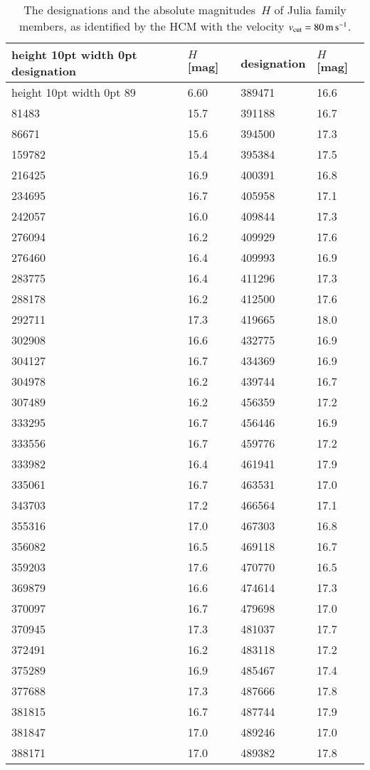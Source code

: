 
\begin{table}
\caption{The designations and the absolute magnitudes~$H$ of Julia family members,
as identified by the HCM with the velocity $v_{\rm cut} = 80\,{\rm m}\,{\rm s}^{-1}$.}
\centering
\begin{tabular}{ll|ll}
\hline
\vrule height 10pt width 0pt
designation & $H$ [mag] & designation & $H$ [mag]\\
\hline
\vrule height 10pt width 0pt
    89 & 6.60 & 389471 & 16.6\\
 81483 & 15.7 & 391188 & 16.7\\
 86671 & 15.6 & 394500 & 17.3\\
159782 & 15.4 & 395384 & 17.5\\
216425 & 16.9 & 400391 & 16.8\\
234695 & 16.7 & 405958 & 17.1\\
242057 & 16.0 & 409844 & 17.3\\
276094 & 16.2 & 409929 & 17.6\\
276460 & 16.4 & 409993 & 16.9\\
283775 & 16.4 & 411296 & 17.3\\
288178 & 16.2 & 412500 & 17.6\\
292711 & 17.3 & 419665 & 18.0\\
302908 & 16.6 & 432775 & 16.9\\
304127 & 16.7 & 434369 & 16.9\\
304978 & 16.2 & 439744 & 16.7\\
307489 & 16.2 & 456359 & 17.2\\
333295 & 16.7 & 456446 & 16.9\\
333556 & 16.7 & 459776 & 17.2\\
333982 & 16.4 & 461941 & 17.9\\
335061 & 16.7 & 463531 & 17.0\\
343703 & 17.2 & 466564 & 17.1\\
355316 & 17.0 & 467303 & 16.8\\
356082 & 16.5 & 469118 & 16.7\\
359203 & 17.6 & 470770 & 16.5\\
369879 & 16.6 & 474614 & 17.3\\
370097 & 16.7 & 479698 & 17.0\\
370945 & 17.3 & 481037 & 17.7\\
372491 & 16.2 & 483118 & 17.2\\
375289 & 16.9 & 485467 & 17.4\\
377688 & 17.3 & 487666 & 17.8\\
381815 & 16.7 & 487744 & 17.9\\
381847 & 17.0 & 489246 & 17.0\\
388171 & 17.0 & 489382 & 17.8\\
\hline
\end{tabular}
\end{table}
